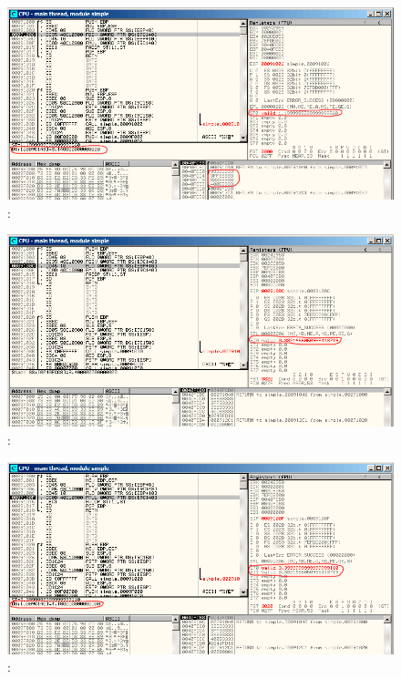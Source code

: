 \begin{figure}[H]
\centering
\includegraphics[scale=\FigScale]{patterns/12_FPU/1_simple/olly1.png}
\caption{\olly: }
\label{fig:FPU_simple_olly_1}
\end{figure}

\begin{figure}[H]
\centering
\includegraphics[scale=\FigScale]{patterns/12_FPU/1_simple/olly2.png}
\caption{\olly: \FDIV {}}
\label{fig:FPU_simple_olly_2}
\end{figure}

\begin{figure}[H]
\centering
\includegraphics[scale=\FigScale]{patterns/12_FPU/1_simple/olly3.png}
\caption{\olly: }
\label{fig:FPU_simple_olly_3}
\end{figure}

